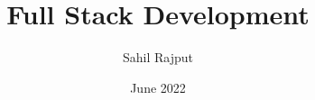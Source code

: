\documentclass[a4paper,12pt]{book}
\begin{document}
\author{Sahil Rajput}
\title{Full Stack Development}
\date{June 2022}


\frontmatter
\maketitle
\tableofcontents

\mainmatter



\backmatter
\end{document}
